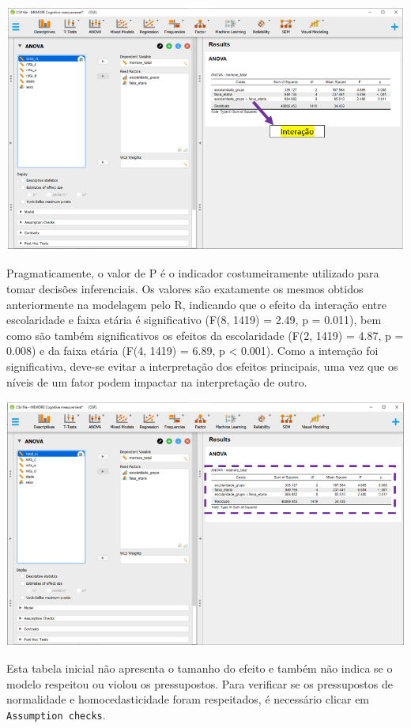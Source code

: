 \documentclass[
]{book}
\begin{document}
\includegraphics{./img/cap_anova_fatorial_resultados1.png}

Pragmaticamente, o valor de P é o indicador costumeiramente utilizado para tomar decisões inferenciais. Os valores são exatamente os mesmos obtidos anteriormente na modelagem pelo R, indicando que o efeito da interação entre escolaridade e faixa etária é significativo (F(8, 1419) = 2.49, p = 0.011), bem como são também significativos os efeitos da escolaridade (F(2, 1419) = 4.87, p = 0.008) e da faixa etária (F(4, 1419) = 6.89, p \textless{} 0.001). Como a interação foi significativa, deve-se evitar a interpretação dos efeitos principais, uma vez que os níveis de um fator podem impactar na interpretação de outro.

\includegraphics{./img/cap_anova_fatorial_resultados2.png}

Esta tabela inicial não apresenta o tamanho do efeito e também não indica se o modelo respeitou ou violou os pressupostos. Para verificar se os pressupostos de normalidade e homocedasticidade foram respeitados, é necessário clicar em \texttt{Assumption\ checks}.
\end{document}
